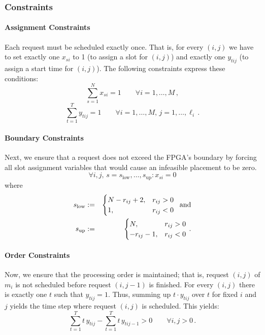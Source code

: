 \documentclass[10pt,journal]{IEEEtran}
\begin{document}
\subsubsection{Constraints}
\paragraph{Assignment Constraints} 
Each request must be scheduled exactly once. That is,
for every $(i,j)$ we have to set exactly one $x_{si}$ to 1 (to assign
a slot for $(i,j)$) and exactly one $y_{tij}$ (to assign a start time
for $(i,j)$).
The following constraints express these conditions:
\begin{equation}\label{fpgatris-ilp-ass1}
\sum_{s=1}^{N}
x_{si} = 1
\qquad
\forall i= 1, \ldots, M\,,
\end{equation}
\begin{equation}\label{fpgatris-ilp-ass2}
\sum_{t=1}^{T}
y_{tij} = 1
\qquad
\forall i= 1, \ldots, M,\,j=1, \ldots, \ell_i\,.
\end{equation}

\medskip
\paragraph{Boundary Constraints} 
Next, we ensure that a request does not exceed the FPGA's boundary by
forcing all slot assignment variables that would cause an infeasible
placement to be zero.\\
\begin{equation}\label{fpgatris-ilp-boundary}
\forall i,j,\,
s = s_{\mathrm{low}}, \ldots, s_{\mathrm{up}}:
x_{si}= 0
\end{equation}  
where
\begin{eqnarray*}
s_{\mathrm{low}} & := & 
\begin{cases}N-r_{ij} + 2, & r_{ij} > 0 \cr 1, & r_{ij} < 0\end{cases}
\;\;\mbox{\rm and}\\
s_{\mathrm{up}} & := & 
\begin{cases} N, & r_{ij} > 0 \cr -r_{ij}-1,  & r_{ij} < 0\end{cases}\,.
\end{eqnarray*}

\medskip
\paragraph{Order Constraints}
Now, we ensure that the processing order is maintained; that is, 
request $(i,j)$ of $m_i$ is not scheduled before
request $(i,j-1)$ is finished.
For every $(i,j)$ there is exactly one $t$ such that $y_{tij}=1$.
Thus, summing up $t\cdot y_{tij}$ over $t$ for fixed $i$ and $j$
yields the time step where request $(i,j)$ is scheduled. This yields:
\begin{equation}\label{fpgatris-ilp-order}
\sum_{t=1}^{T}
t\,y_{tij}- 
\sum_{t=1}^{T}
t\,y_{tij-1}> 0
\qquad
\forall i,j>0\,.
\end{equation}
\end{document}
